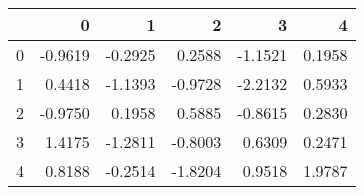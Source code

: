 \begin{tabular}{lrrrrr}
\toprule
{} &       0 &       1 &       2 &       3 &      4 \\
\midrule
0 & -0.9619 & -0.2925 &  0.2588 & -1.1521 & 0.1958 \\
1 &  0.4418 & -1.1393 & -0.9728 & -2.2132 & 0.5933 \\
2 & -0.9750 &  0.1958 &  0.5885 & -0.8615 & 0.2830 \\
3 &  1.4175 & -1.2811 & -0.8003 &  0.6309 & 0.2471 \\
4 &  0.8188 & -0.2514 & -1.8204 &  0.9518 & 1.9787 \\
\bottomrule
\end{tabular}
